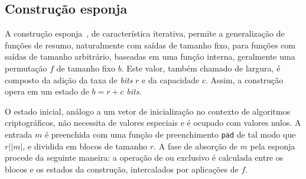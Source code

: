 \documentclass{ufsctex/ufsctex}
\newcommand{\length}[1]{\vert{} #1 \vert{}}
\begin{document}
\subsection{Construção esponja}\label{subsection:sponge}

A construção esponja~\cite{Bertoni:misc:2011a:jan}, de característica
iterativa, permite a generalização de funções de resumo, naturalmente com
saídas de tamanho fixo, para funções com saídas de tamanho arbitrário, baseadas
em uma função interna, geralmente uma permutação $f$ de tamanho fixo $b$. Este
valor, também chamado de largura, é composto da adição da taxa de \emph{bits}
$r$ e da capacidade $c$. Assim, a construção opera em um estado de $b = r + c$
\emph{bits}.

O estado inicial, análogo a um vetor de inicialização no contexto de algoritmos
criptográficos, não necessita de valores especiais e é ocupado com valores
nulos. A entrada $m$ é preenchida com uma função de preenchimento \texttt{pad}
de tal modo que $r \mid \length{m}$, e dividida em blocos de tamanho $r$. A
fase de absorção de $m$ pela esponja procede da seguinte maneira: a operação de
ou exclusivo é calculada entre os blocos e os estados da construção,
intercalados por aplicações de $f$.
\end{document}
